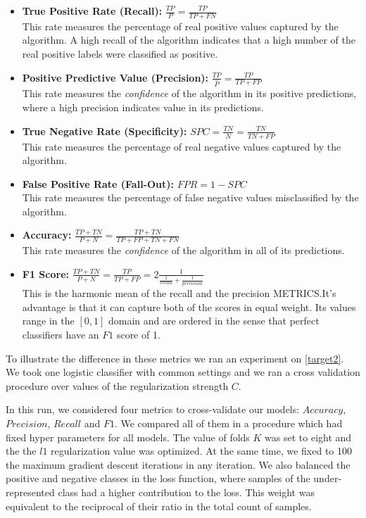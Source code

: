 \begin{itemize}
\item \textbf{True Positive Rate (Recall):} $\frac{TP}{P} = \frac{TP}{TP + FN}$ \\ This rate measures the percentage of real positive values captured by the algorithm.
A high recall of the algorithm indicates that a high number of the real positive labels were classified as positive.


\item \textbf{Positive Predictive Value (Precision):} $\frac{TP}{\hat{P}} = \frac{TP}{TP + FP}$ \\ This rate measures the \textit{confidence} of the algorithm in its positive predictions, where a high precision indicates value in its predictions.

\item \textbf{True Negative Rate (Specificity):} $ SPC = \frac{TN}{N} = \frac{TN}{TN + FP}$ \\ This rate measures the percentage of real negative values captured by the algorithm.


\item \textbf{False Positive Rate (Fall-Out):} $FPR = 1 - SPC$ \\ This rate measures the percentage of false negative values misclassified by the algorithm.

\item \textbf{Accuracy:} $\frac{TP + TN}{P + N} = \frac{TP + TN}{TP + FP + TN + FN}$ \\ This rate measures the \textit{confidence} of the algorithm in all of its predictions.


\item \textbf{F1 Score:} $\frac{TP + TN}{P + N} = \frac{TP}{TP + FP} = 2 \frac{1}{ \frac{1}{recall} + \frac{1}{precision} }$ \\ This is the harmonic mean of the recall and the precision METRICS.\@ It's advantage is that it can capture both of the scores in equal weight.
Its values range in the ${[0,1 ]}$ domain and are ordered in the sense that perfect classifiers have an $F1$ score of 1.

\end{itemize}


To illustrate the difference in these metrics we ran an experiment on \cref{target2}.
We took one logistic classifier with common settings and we ran a cross validation procedure over values of the regularization strength $C$.

In this run, we considered four metrics to cross-validate our models: $Accuracy$, $Precision$, $Recall$ and $F1$.
We compared all of them in a procedure which had fixed hyper parameters for all models.
The value of folds $K$ was set to eight and the the $l1$ regularization value was optimized. 
At the same time, we fixed to 100 the maximum gradient descent iterations in any iteration. 
We also balanced the positive and negative classes in the loss function, where samples of the under-represented class had a higher contribution to the loss.
This weight was equivalent to the reciprocal of their ratio in the total count of samples.

